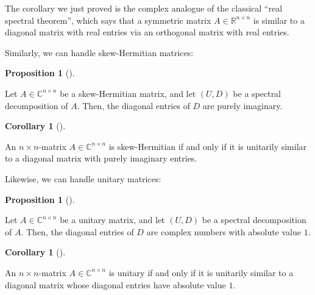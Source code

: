 \documentclass[numbers=enddot,12pt,final,onecolumn,notitlepage]{scrartcl}%
\numberwithin{exer}{subsection}
\theoremstyle{definition}
\newtheorem{prop}[theo]{Proposition}
\newenvironment{proposition}[1][]
{\begin{prop}[#1]\begin{leftbar}}
{\end{leftbar}\end{prop}}
\newtheorem{coro}[theo]{Corollary}
\newenvironment{corollary}[1][]
{\begin{coro}[#1]\begin{leftbar}}
{\end{leftbar}\end{coro}}
\begin{document}
The corollary we just proved is the complex analogue of the classical
\textquotedblleft real spectral theorem\textquotedblright, which says that a
symmetric matrix $A\in\mathbb{R}^{n\times n}$ is similar to a diagonal matrix
with real entries via an orthogonal matrix with real entries.

Similarly, we can handle skew-Hermitian matrices:

\begin{proposition}
Let $A\in\mathbb{C}^{n\times n}$ be a skew-Hermitian matrix, and let $\left(
U,D\right)  $ be a spectral decomposition of $A$. Then, the diagonal entries
of $D$ are purely imaginary.
\end{proposition}

\begin{corollary}
An $n\times n$-matrix $A\in\mathbb{C}^{n\times n}$ is skew-Hermitian if and
only if it is unitarily similar to a diagonal matrix with purely imaginary entries.
\end{corollary}

Likewise, we can handle unitary matrices:

\begin{proposition}
Let $A\in\mathbb{C}^{n\times n}$ be a unitary matrix, and let $\left(
U,D\right)  $ be a spectral decomposition of $A$. Then, the diagonal entries
of $D$ are complex numbers with absolute value $1$.
\end{proposition}

\begin{corollary}
An $n\times n$-matrix $A\in\mathbb{C}^{n\times n}$ is unitary if and only if
it is unitarily similar to a diagonal matrix whose diagonal entries have
absolute value $1$.
\end{corollary}
\end{document}
